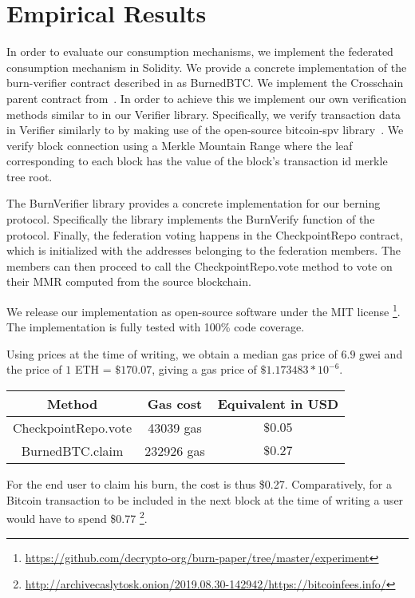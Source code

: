 \section{Empirical Results}

\newcommand{\rref}[1]{}

In order to evaluate our consumption mechanisms, we implement the federated consumption mechanism in Solidity. We provide a concrete implementation of the \textsf{burn-verifier} contract described in \rref{alg.burn-verifier} as \textsf{BurnedBTC}. We implement the \textsf{Crosschain} parent contract from~\cite{pow-sidechains}. In order to achieve this we implement our own verification methods similar to \rref{alg.verify-event-federation} in our \textsf{Verifier} library. Specifically, we verify transaction data in \textsf{Verifier} similarly to \rref{alg.verify-tx} by making use of the open-source bitcoin-spv library~\cite{bitcoin-spv-library}. We verify block connection using a Merkle Mountain Range where the leaf corresponding to each block has the value of the block's transaction id merkle tree root.

The \textsf{BurnVerifier} library provides a concrete implementation for our berning protocol. Specifically the library implements the \textsf{BurnVerify} function of the protocol. Finally, the federation voting happens in the \textsf{CheckpointRepo} contract, which is initialized with the addresses belonging to the federation members. The members can then proceed to call the \textsf{CheckpointRepo.vote} method to vote on their MMR computed from the source blockchain.

We release our implementation as open-source software under the MIT license
\footnote{\url{https://github.com/decrypto-org/burn-paper/tree/master/experiment}}.
The implementation is fully tested with 100\% code coverage.

Using prices at the time of writing, we obtain a median gas price of $6.9$ gwei and the price of $1$ ETH = $\$170.07$, giving a gas price of $\$1.173483 * 10^{-6}$.

\begin{center}
    \begin{tabular}{ |c|c|c| }
     \hline
     Method & Gas cost & Equivalent in USD \\
     \hline
     \textsf{CheckpointRepo.vote} & 43039 gas & $\$0.05$ \\
     \textsf{BurnedBTC.claim} & 232926 gas & $\$0.27$ \\
     \hline
    \end{tabular}
\end{center}

For the end user to claim his burn, the cost is thus \$0.27. Comparatively, for a Bitcoin transaction to be included in the next block at the time of writing a user would have to spend \$0.77
\footnote{\url{http://archivecaslytosk.onion/2019.08.30-142942/https://bitcoinfees.info/}}.
